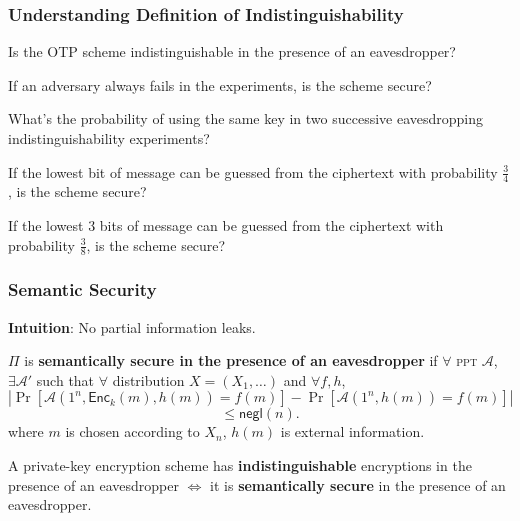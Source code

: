 \begin{frame}\frametitle{Understanding Definition of Indistinguishability}
\begin{exampleblock}{Is the OTP scheme indistinguishable in the presence of an eavesdropper?}
\end{exampleblock}
\begin{exampleblock}{If an adversary always fails in the experiments, is the scheme secure?}
\end{exampleblock}
\begin{exampleblock}{What's the probability of using the same key in two successive eavesdropping indistinguishability experiments?}
\end{exampleblock}
\begin{exampleblock}{If the lowest bit of message can be guessed from the ciphertext with probability $\frac{3}{4}$, is the scheme secure?}
\end{exampleblock}
\begin{exampleblock}{If the lowest 3 bits of message can be guessed from the ciphertext with probability $\frac{3}{8}$, is the scheme secure?}
\end{exampleblock}
\end{frame}
\begin{frame}\frametitle{Semantic Security}
\textbf{Intuition}: No partial information leaks.
\begin{definition}
$\Pi$ is \textbf{semantically secure in the presence of an eavesdropper} if $\forall$ \textsc{ppt} $\mathcal{A}$, $\exists \mathcal{A'}$ such that $\forall$ distribution $X = (X_1, \dots)$ and $\forall f, h$,
\[ \left|\Pr[\mathcal{A}(1^n,\mathsf{Enc}_k(m),h(m))=f(m)]-\Pr[\mathcal{A}(1^n,h(m))=f(m)]\right| 
\]
\[ \le \mathsf{negl}(n).
\]
where $m$ is chosen according to $X_n$, $h(m)$ is external information.
\end{definition}
\begin{theorem}
A private-key encryption scheme has \textbf{indistinguishable} encryptions in the presence of an eavesdropper $\iff$ it is \textbf{semantically secure} in the presence of an eavesdropper.
\end{theorem}
\end{frame}
